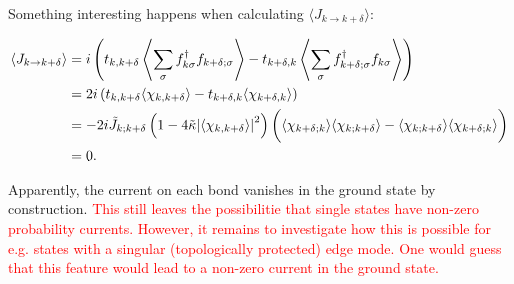 \documentclass{article}
\begin{document}
Something interesting happens when calculating $\langle J_{k\rightarrow k+\delta} \rangle$:

\begin{align}
	\langle J_{k\rightarrow k+\delta} \rangle &= i\left(t_{k,k+\delta}\left\langle \sum_\sigma f_{k\sigma}^\dagger f_{k+\delta;\sigma}\right\rangle - t_{k+\delta,k} \left\langle \sum_\sigma f_{k+\delta;\sigma}^\dagger f_{k\sigma} \right\rangle\right) \notag \\
	&= 2i\left(t_{k,k+\delta}\langle \chi_{k,k+\delta} \rangle - t_{k+\delta,k} \langle \chi_{k+\delta,k} \rangle\right) \notag \\
	&=-2i \tilde{J}_{k;k+\delta}\left(1-4\tilde{\kappa}\abs{\langle\chi_{k,k+\delta}\rangle}^2\right)\bigg(\langle\chi_{k+\delta;k}\rangle\langle\chi_{k;k+\delta}\rangle - \langle\chi_{k;k+\delta}\rangle\langle \chi_{k+\delta;k}\rangle\bigg) \notag \\
	&= 0.
\end{align}

Apparently, the current on each bond vanishes in the ground state by construction. \textcolor{red}{This still leaves the possibilitie that single states have non-zero probability currents. However, it remains to investigate how this is possible for e.g. states with a singular (topologically protected) edge mode. One would guess that this feature would lead to a non-zero current in the ground state.}
\end{document}
